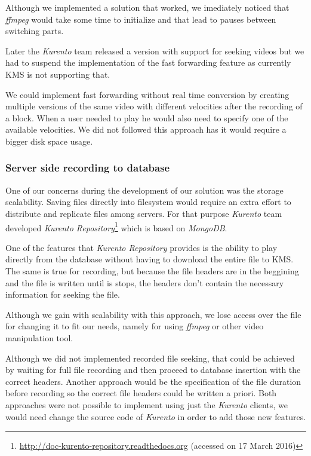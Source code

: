 	Although we implemented a solution that worked, we imediately noticed that \emph{ffmpeg} would take some time to initialize and that lead to pauses between switching parts.

	Later the \emph{Kurento} team released a version with support for seeking videos but we had to suspend the implementation of the fast forwarding feature as currently \ac{KMS} is not supporting that.

	We could implement fast forwarding without real time conversion by creating multiple versions of the same video with different velocities after the recording of a block. When a user needed to play he would also need to specify one of the available velocities. We did not followed this approach has it would require a bigger disk space usage. 

\subsubsection{Server side recording to database}

	One of our concerns during the development of our solution was the storage scalability. Saving files directly into filesystem would require an extra effort to distribute and replicate files among servers. For that purpose \emph{Kurento} team developed \emph{Kurento Repository}\footnote{\url{http://doc-kurento-repository.readthedocs.org} (accessed on 17 March 2016)} which is based on \emph{MongoDB}.

	One of the features that \emph{Kurento Repository} provides is the ability to play directly from the database without having to download the entire file to \ac{KMS}. The same is true for recording, but because the file headers are in the beggining and the file is written until is stops, the headers don't contain the necessary information for seeking the file.

	Although we gain with scalability with this approach, we lose access over the file for changing it to fit our needs, namely for using \emph{ffmpeg} or other video manipulation tool.

	Although we did not implemented recorded file seeking, that could be achieved by waiting for full file recording and then proceed to database insertion with the correct headers. Another approach would be the specification of the file duration before recording so the correct file headers could be written a priori. Both approaches were not possible to implement using just the \emph{Kurento} clients, we would need change the source code of \emph{Kurento} in order to add those new features.





